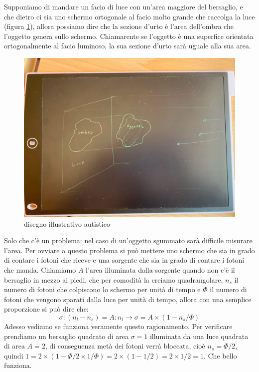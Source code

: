 \documentclass[11pt,a4paper]{article}
\begin{document}
		Supponiamo di mandare un facio di luce con un'area maggiore del bersaglio, e che dietro ci sia uno schermo ortogonale al facio molto grande che raccolga la luce (figura \ref{fig:ombra}), allora possiamo dire che la sezione d'urto è l'area dell'ombra che l'oggetto genera sullo schermo.\newline
		Chiamarente se l'oggetto è una superfice orientata ortogonalmente al facio luminoso, la sua sezione d'urto sarà uguale alla sua area.\newline
		\begin{figure}
			\centering
    		\includegraphics[width=\linewidth]{Immagini/ombra.jpg}
    		\caption{disegno illustrativo autistico}
    		\label{fig:ombra}
		\end{figure}

		Solo che c'è un problema: nel caso di un'oggetto sgummato sarà difficile misurare l'area. Per ovviare a questo problema si può mettere uno schermo che sia in grado di contare i fotoni che riceve e una sorgente che sia in grado di contare i fotoni che manda.\newline
		Chiamiamo $A$ l'area illuminata dalla sorgente quando non c'è il bersaglio in mezzo ai piedi, che per comodità la creiamo quadrangolare, $n_s$ il numero di fotoni che colpiscono lo schermo per unità di tempo e $\Phi$ il numero di fotoni che vengono sparati dalla luce per unità di tempo, allora con una semplice proporzione si può dire che:
		\begin{equation}
			\sigma:(n_l-n_s)=A:n_l \rightarrow \sigma=A\times(1-n_s/\Phi)
			\label{eq:sigma_luce}
		\end{equation}
		Adesso vediamo se funziona veramente questo ragionamento.\newline
		Per verificare prendiamo un bersaglio quadrato di area $\sigma=1$ illuminata da una luce quadrata di area $A=2$, di conseguenza metà dei fotoni verrà bloccata, cioè $n_s=\Phi/2$, quindi $1=2\times(1-\Phi/2\times 1/\Phi)=2\times(1-1/2)=2\times 1/2=1$.\newline
		Che bello funziona.\newline
\end{document}
